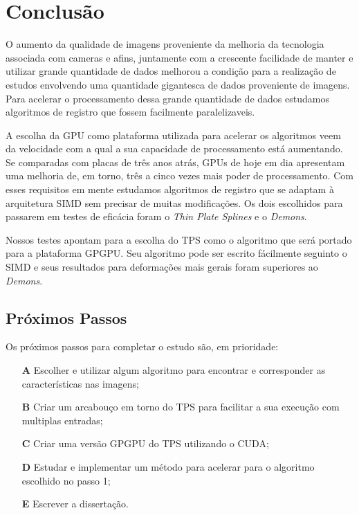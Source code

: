 \chapter{Conclusão}
\label{cap:conclusoes}

	O aumento da qualidade de imagens proveniente da melhoria da tecnologia associada com cameras e afins, juntamente com
a crescente facilidade de manter e utilizar grande quantidade de dados melhorou a condição para a realização de estudos
envolvendo uma quantidade gigantesca de dados proveniente de imagens. Para acelerar o processamento dessa
grande quantidade de dados estudamos algoritmos de registro que fossem facilmente paralelizaveis.

	A escolha da GPU como plataforma utilizada para acelerar os algoritmos veem da velocidade com a qual a sua capacidade
de processamento está aumentando. Se comparadas com placas de três anos atrás, GPUs de hoje em dia apresentam uma melhoria
de, em torno, três a cinco vezes mais poder de processamento. Com esses requisitos em mente estudamos algoritmos de registro
que se adaptam à arquitetura SIMD sem precisar de muitas modificações. Os dois escolhidos para passarem em testes de
eficácia foram o \textit{Thin Plate Splines} e o \textit{Demons}.

	Nossos testes apontam para a escolha do TPS como o algoritmo que será portado para a plataforma GPGPU. Seu algoritmo
pode ser escrito fácilmente seguinto o SIMD e seus resultados para deformações mais gerais foram superiores ao 
\textit{Demons}.

\section{Próximos Passos} 

	Os próximos passos para completar o estudo são, em prioridade:
\begin{itemize}
	\item[\textbf{A}] Escolher e utilizar algum algoritmo para encontrar e corresponder as características nas imagens;
	\item[\textbf{B}] Criar um arcabouço em torno do TPS para facilitar a sua execução com multiplas entradas;
	\item[\textbf{C}] Criar uma versão GPGPU do TPS utilizando o CUDA;
	\item[\textbf{D}] Estudar e implementar um método para acelerar para o algoritmo escolhido no passo 1;
	\item[\textbf{E}] Escrever a dissertação.
\end{itemize}

